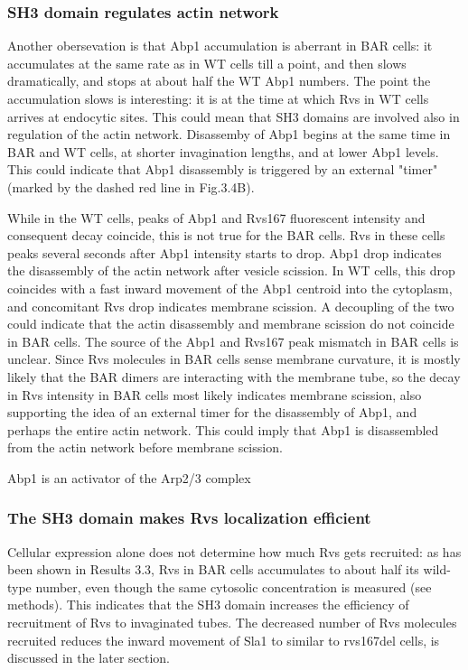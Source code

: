 \subsubsection{SH3 domain regulates actin network} 
Another obersevation is that Abp1 accumulation is aberrant in BAR cells: it accumulates at the same rate as in WT cells till a point, and then slows dramatically, and stops at about half the WT Abp1 numbers.
The point the accumulation slows is interesting: it is at the time at which Rvs in WT cells arrives at endocytic sites. This could mean that SH3 domains are involved also in regulation of the actin network. Disassemby of Abp1 begins at the same time in BAR and WT cells, at shorter invagination lengths, and at lower Abp1 levels. This could indicate that Abp1 disassembly is triggered by an external "timer" (marked by the dashed red line in Fig.3.4B). 
	\vspace{5mm}
	
While in the WT cells, peaks of Abp1 and Rvs167 fluorescent intensity and consequent decay coincide, this is not true for the BAR cells. Rvs in these cells peaks several seconds after Abp1 intensity starts to drop. Abp1 drop indicates the disassembly of the actin network after vesicle scission. In WT cells, this drop coincides with a fast inward movement of the Abp1 centroid into the cytoplasm, and concomitant Rvs drop indicates membrane scission. A decoupling of the two could indicate that the actin disassembly and membrane scission do not coincide in BAR cells. The source of the Abp1 and Rvs167 peak mismatch in BAR cells is unclear. Since Rvs molecules in BAR cells sense membrane curvature, it is mostly likely that the BAR dimers are interacting with the membrane tube, so the decay in Rvs intensity in BAR cells most likely indicates membrane scission, also supporting the idea of an external timer for the disassembly of Abp1, and perhaps the entire actin network. This could imply that Abp1 is disassembled from the actin network before membrane scission. 

Abp1 is an activator of the Arp2/3 complex 

\subsubsection{The SH3 domain makes Rvs localization efficient}
Cellular expression alone does not determine how much Rvs gets recruited: as has been shown in Results 3.3, Rvs in BAR cells accumulates to about half its wild-type number, even though the same cytosolic concentration is measured (see methods). This indicates that the SH3 domain increases the efficiency of recruitment of Rvs to invaginated tubes. The decreased number of Rvs molecules recruited reduces the inward movement of Sla1 to similar to rvs167del cells, is discussed in the later section.


